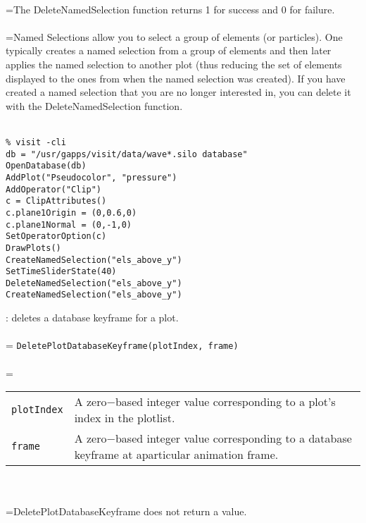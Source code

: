 \documentclass[10pt,a4paper]{report}
\begin{document}
 \\ 
\hangindent=\parindent The DeleteNamedSelection function returns 1 for success and 0 for failure. \\[-3mm] 

 \\ 
\hangindent=\parindent Named Selections allow you to select a group of elements (or particles). One typically creates a named selection from a group of elements and then later applies the named selection to another plot (thus reducing the set of elements displayed to the ones from when the named selection was created).  If you have created a named selection that you are no longer interested in, you can delete it with the DeleteNamedSelection function. \\[-3mm] 

\\[-6mm]
\begin{verbatim}% visit -cli
db = "/usr/gapps/visit/data/wave*.silo database"
OpenDatabase(db)
AddPlot("Pseudocolor", "pressure")
AddOperator("Clip")
c = ClipAttributes()
c.plane1Origin = (0,0.6,0)
c.plane1Normal = (0,-1,0)
SetOperatorOption(c)
DrawPlots()
CreateNamedSelection("els_above_y")
SetTimeSliderState(40)
DeleteNamedSelection("els_above_y")
CreateNamedSelection("els_above_y")
\end{verbatim}
\newpage


{}
: deletes a database keyframe for a plot.\\[-3mm]

 \\ 
\hangindent=\parindent 
\verb!DeletePlotDatabaseKeyframe(plotIndex, frame)!\\ [-3mm]

 \\ 
\hangindent=\parindent 
\begin{tabular}{lp{9cm}}
\verb!plotIndex! & A zero$-$based integer value corresponding to a plot's index in the plotlist. \\
\verb!frame! & A zero$-$based integer value corresponding to a database keyframe at aparticular animation frame. \\
\end{tabular} \\[-2mm]


 \\ 
\hangindent=\parindent DeletePlotDatabaseKeyframe does not return a value. \\[-3mm] 
\end{document}

